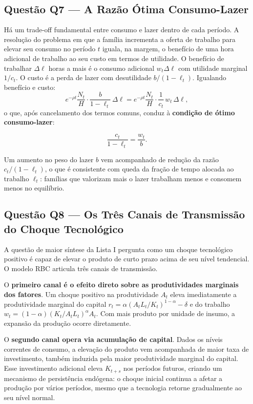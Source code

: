 \documentclass[12pt, a4paper]{article}
\begin{document}
\subsection{Questão Q7 --- A Razão Ótima Consumo-Lazer}

Há um trade-off fundamental entre consumo e lazer dentro de cada período. A resolução do problema em que a família incrementa a oferta de trabalho para elevar seu consumo no período $t$ iguala, na margem, o benefício de uma hora adicional de trabalho ao seu custo em termos de utilidade. O benefício de trabalhar $\Delta\ell$ horas a mais é o consumo adicional $w_t\Delta\ell$ com utilidade marginal $1/c_t$. O custo é a perda de lazer com desutilidade $b/(1-\ell_t)$. Igualando benefício e custo:
\[
e^{-\rho t}\frac{N_t}{H}\cdot\frac{b}{1-\ell_t}\,\Delta\ell = e^{-\rho t}\frac{N_t}{H}\cdot\frac{1}{c_t}\,w_t\,\Delta\ell,
\]
o que, após cancelamento dos termos comuns, conduz à \textbf{condição de ótimo consumo-lazer}:

\begin{fatorbox}[title={Razão Ótima Consumo-Lazer (Q7)}]
\[
\frac{c_t}{1-\ell_t} = \frac{w_t}{b}.
\]
\end{fatorbox}

Um aumento no peso do lazer $b$ vem acompanhado de redução da razão $c_t/(1-\ell_t)$, o que é consistente com queda da fração de tempo alocada ao trabalho $\ell_t$: famílias que valorizam mais o lazer trabalham menos e consomem menos no equilíbrio.

\subsection{Questão Q8 --- Os Três Canais de Transmissão do Choque Tecnológico}

A questão de maior síntese da Lista I pergunta como um choque tecnológico positivo é capaz de elevar o produto de curto prazo acima de seu nível tendencial. O modelo RBC articula três canais de transmissão.

O \textbf{primeiro canal é o efeito direto sobre as produtividades marginais dos fatores}. Um choque positivo na produtividade $A_t$ eleva imediatamente a produtividade marginal do capital $r_t = \alpha(A_tL_t/K_t)^{1-\alpha} - \delta$ e do trabalho $w_t = (1-\alpha)(K_t/A_tL_t)^\alpha A_t$. Com mais produto por unidade de insumo, a expansão da produção ocorre diretamente.

O \textbf{segundo canal opera via acumulação de capital}. Dados os níveis correntes de consumo, a elevação do produto vem acompanhada de maior taxa de investimento, também induzida pela maior produtividade marginal do capital. Esse investimento adicional eleva $K_{t+s}$ nos períodos futuros, criando um mecanismo de persistência endógena: o choque inicial continua a afetar a produção por vários períodos, mesmo que a tecnologia retorne gradualmente ao seu nível normal.
\end{document}
